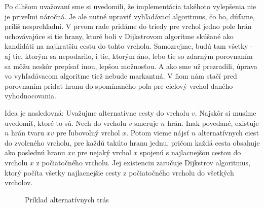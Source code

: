 Po dlhšom uvažovaní sme si uvedomili, že implementácia takéhoto vylepšenia nie je priveľmi náročná. Je ale nutné upraviť vyhľadávací algoritmus, čo ho, dúfame, príliš nesprehľadní. V prvom rade pridáme do triedy pre vrchol jedno pole hrán uchovávajúce si tie hrany, ktoré boli v Dijkstrovom algoritme skúšané ako kandidáti na najkratšiu cestu do tohto vrcholu. Samozrejme, budú tam všetky - aj tie, ktorým sa nepodarilo, i tie, ktorým áno, lebo tie so zdarným porovnaním sa môžu neskôr prepísať inou, lepšou možnosťou. A ako sme už prezradili, úprava vo vyhľadávacom algoritme tiež nebude markantná. V ňom nám stačí pred porovnaním pridať hranu do spomínaného poľa pre cieľový vrchol daného vyhodnocovania.\newline

Idea je nasledovná: Uvažujme alternatívne cesty do vrcholu $v$. Najskôr si musíme uvedomiť, ktoré to sú. Nech do vrcholu $v$ smeruje $n$ hrán. Inak povedané, existuje $n$ hrán tvaru $xv$ pre ľubovoľný vrchol $x$. Potom vieme nájsť $n$ alternatívnych ciest do zvoleného vrcholu, pre každú takúto hranu jednu, pričom každá cesta obsahuje ako poslednú hranu $xv$ pre nejaký vrchol $x$ spojenú s najlacnejšou cestou do vrcholu $x$ z počiatočného vrcholu. Jej existenciu zaručuje Dijkstrov algoritmus, ktorý počíta všetky najlacnejšie cesty z počiatočného vrcholu do všetkých vrcholov.\newline

\begin{figure}[H]
  \caption{Príklad alternatívnych trás}
  \label{alternativ_priklad2}
\end{figure}

